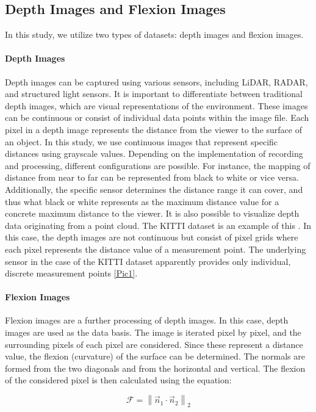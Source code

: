 \documentclass[conference, a4paper]{IEEEtran}
\begin{document}
\subsection{Depth Images and Flexion Images}
In this study, we utilize two types of datasets: depth images and flexion images.

\paragraph{Depth Images}
Depth images can be captured using various sensors, including LiDAR, RADAR, and structured light sensors. It is important to differentiate between traditional depth images, which are visual representations of the environment. These images can be continuous or consist of individual data points within the image file. Each pixel in a depth image represents the distance from the viewer to the surface of an object. In this study, we use continuous images that represent specific distances using grayscale values. Depending on the implementation of recording and processing, different configurations are possible. For instance, the mapping of distance from near to far can be represented from black to white or vice versa. Additionally, the specific sensor determines the distance range it can cover, and thus what black or white represents as the maximum distance value for a concrete maximum distance to the viewer. It is also possible to visualize depth data originating from a point cloud. The KITTI dataset is an example of this \cite{kitti_dataset}. In this case, the depth images are not continuous but consist of pixel grids where each pixel represents the distance value of a measurement point. The underlying sensor in the case of the KITTI dataset apparently provides only individual, discrete measurement points \ref{Pic1}.

\paragraph{Flexion Images}
Flexion images are a further processing of depth images. In this case, depth images are used as the data basis. The image is iterated pixel by pixel, and the surrounding pixels of each pixel are considered. Since these represent a distance value, the flexion (curvature) of the surface can be determined. The normals are formed from the two diagonals and from the horizontal and vertical. The flexion of the considered pixel is then calculated using the equation:

\begin{equation}
	\mathcal{F} = \left\| \vec{n}_1 \cdot \vec{n}_2 \right\|_2
	\label{eq:flexion}
\end{equation}
\end{document}

